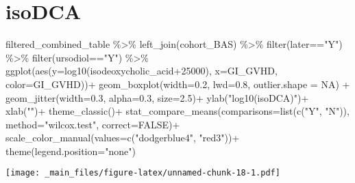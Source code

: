 \documentclass[
]{book}
\newenvironment{Shaded}{\begin{snugshade}}{\end{snugshade}}
\newcommand{\AttributeTok}[1]{\textcolor[rgb]{0.77,0.63,0.00}{#1}}
\newcommand{\ConstantTok}[1]{\textcolor[rgb]{0.00,0.00,0.00}{#1}}
\newcommand{\DecValTok}[1]{\textcolor[rgb]{0.00,0.00,0.81}{#1}}
\newcommand{\FloatTok}[1]{\textcolor[rgb]{0.00,0.00,0.81}{#1}}
\newcommand{\FunctionTok}[1]{\textcolor[rgb]{0.00,0.00,0.00}{#1}}
\newcommand{\NormalTok}[1]{#1}
\newcommand{\SpecialCharTok}[1]{\textcolor[rgb]{0.00,0.00,0.00}{#1}}
\newcommand{\StringTok}[1]{\textcolor[rgb]{0.31,0.60,0.02}{#1}}
\begin{document}
\hypertarget{isodca}{%
\section{isoDCA}\label{isodca}}

\begin{Shaded}
\begin{Highlighting}[]
\NormalTok{filtered\_combined\_table }\SpecialCharTok{\%\textgreater{}\%} 
  \FunctionTok{left\_join}\NormalTok{(cohort\_BAS) }\SpecialCharTok{\%\textgreater{}\%} 
  \FunctionTok{filter}\NormalTok{(later}\SpecialCharTok{==}\StringTok{"Y"}\NormalTok{) }\SpecialCharTok{\%\textgreater{}\%} 
  \FunctionTok{filter}\NormalTok{(ursodiol}\SpecialCharTok{==}\StringTok{"Y"}\NormalTok{) }\SpecialCharTok{\%\textgreater{}\%} 
  \FunctionTok{ggplot}\NormalTok{(}\FunctionTok{aes}\NormalTok{(}\AttributeTok{y=}\FunctionTok{log10}\NormalTok{(isodeoxycholic\_acid}\SpecialCharTok{+}\DecValTok{25000}\NormalTok{), }\AttributeTok{x=}\NormalTok{GI\_GVHD, }\AttributeTok{color=}\NormalTok{GI\_GVHD))}\SpecialCharTok{+}
  \FunctionTok{geom\_boxplot}\NormalTok{(}\AttributeTok{width=}\FloatTok{0.2}\NormalTok{, }\AttributeTok{lwd=}\FloatTok{0.8}\NormalTok{, }\AttributeTok{outlier.shape =} \ConstantTok{NA}\NormalTok{) }\SpecialCharTok{+}
  \FunctionTok{geom\_jitter}\NormalTok{(}\AttributeTok{width=}\FloatTok{0.3}\NormalTok{, }\AttributeTok{alpha=}\FloatTok{0.3}\NormalTok{, }\AttributeTok{size=}\FloatTok{2.5}\NormalTok{)}\SpecialCharTok{+}
  \FunctionTok{ylab}\NormalTok{(}\StringTok{"log10(isoDCA)"}\NormalTok{)}\SpecialCharTok{+}
  \FunctionTok{xlab}\NormalTok{(}\StringTok{""}\NormalTok{)}\SpecialCharTok{+}
  \FunctionTok{theme\_classic}\NormalTok{()}\SpecialCharTok{+}
  \FunctionTok{stat\_compare\_means}\NormalTok{(}\AttributeTok{comparisons=}\FunctionTok{list}\NormalTok{(}\FunctionTok{c}\NormalTok{(}\StringTok{"Y"}\NormalTok{, }\StringTok{"N"}\NormalTok{)),}
                     \AttributeTok{method=}\StringTok{"wilcox.test"}\NormalTok{,}
                     \AttributeTok{correct=}\ConstantTok{FALSE}\NormalTok{)}\SpecialCharTok{+}
  \FunctionTok{scale\_color\_manual}\NormalTok{(}\AttributeTok{values=}\FunctionTok{c}\NormalTok{(}\StringTok{"dodgerblue4"}\NormalTok{, }\StringTok{"red3"}\NormalTok{))}\SpecialCharTok{+}
  \FunctionTok{theme}\NormalTok{(}\AttributeTok{legend.position=}\StringTok{"none"}\NormalTok{)}
\end{Highlighting}
\end{Shaded}

\texttt{[image: \_main\_files/figure-latex/unnamed-chunk-18-1.pdf]}
\end{document}
